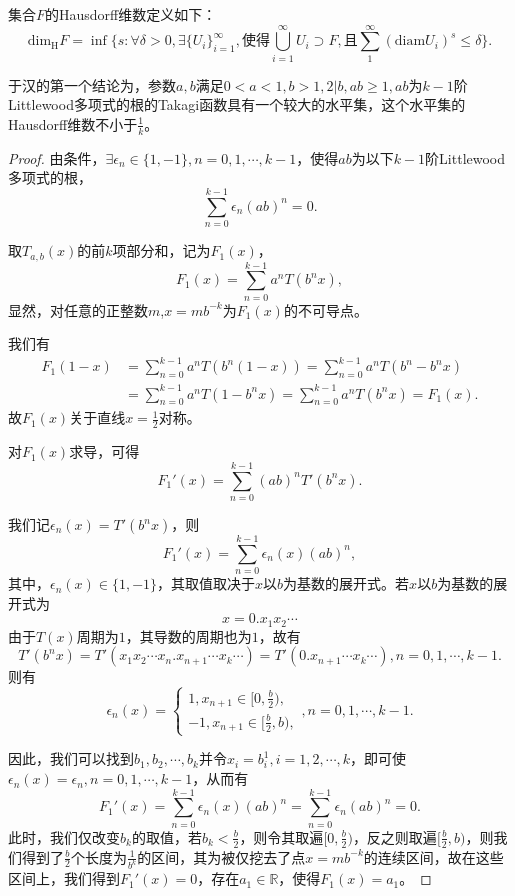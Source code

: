 \begin{definition}[Hausdorff维数]
    集合$F$的Hausdorff维数定义如下：
    $$
        \mathrm{dim_H}F=\inf\Big\{s:\forall \delta>0,\exists\{U_i\}_{i=1}^\infty,\mbox{使得}\bigcup_{i=1}^\infty U_i\supset F,\mbox{且}\sum_{1}^{\infty}(\mathrm{diam}U_i)^s\le\delta\Big\}.
    $$
\end{definition}

于汉的第一个结论为，参数$a,b$满足$0<a<1,b>1,2|b,ab\ge1,ab$为$k-1$阶Littlewood多项式的根的Takagi函数具有一个较大的水平集，这个水平集的Hausdorff维数不小于$\frac{1}{k}$。

\begin{proof}
    由条件，$\exists\epsilon_n\in\{1,-1\},n=0,1,\cdots,k-1$，使得$ab$为以下$k-1$阶Littlewood多项式的根，
    $$
        \sum_{n=0}^{k-1}\epsilon_n(ab)^n=0.
    $$

    取$T_{a,b}(x)$的前$k$项部分和，记为$F_1(x)$，
    $$
        F_1(x)=\sum_{n=0}^{k-1}a^nT(b^nx),
    $$
    显然，对任意的正整数$m$,$x=mb^{-k}$为$F_1(x)$的不可导点。

    我们有
    $$
        \begin{aligned}
            F_1(1-x) & =\sum_{n=0}^{k-1}a^nT(b^n(1-x))=\sum_{n=0}^{k-1}a^nT(b^n-b^nx) \\
                   & =\sum_{n=0}^{k-1}a^nT(1-b^nx)=\sum_{n=0}^{k-1}a^nT(b^nx)=F_1(x).
        \end{aligned}
    $$
    故$F_1(x)$关于直线$x=\frac{1}{2}$对称。

    对$F_1(x)$求导，可得
    $$
        F_1'(x)=\sum_{n=0}^{k-1}(ab)^nT'(b^nx).
    $$

    我们记$\epsilon_n(x)=T'(b^nx)$，则
    $$
        F_1'(x)=\sum_{n=0}^{k-1}\epsilon_n(x)(ab)^n,
    $$
    其中，$\epsilon_n(x)\in\{1,-1\}$，其取值取决于$x$以$b$为基数的展开式。若$x$以$b$为基数的展开式为
    $$
        x=0.x_1x_2\cdots
    $$
    由于$T(x)$周期为$1$，其导数的周期也为$1$，故有
    $$
        T'(b^nx)=T'(x_1x_2\cdots x_n.x_{n+1}\cdots x_k\cdots)=T'(0.x_{n+1}\cdots x_k\cdots),n=0,1,\cdots,k-1.
    $$
    则有
    $$
        \epsilon_n(x)=
        \begin{cases}
            1,x_{n+1}\in[0,\frac{b}{2}),\\
            -1,x_{n+1}\in[\frac{b}{2},b),
        \end{cases},n=0,1,\cdots,k-1.
    $$

    因此，我们可以找到$b_1,b_2,\cdots,b_k$并令$x_i=b^1_i,i=1,2,\cdots,k$，即可使$\epsilon_n(x)=\epsilon_n,n=0,1,\cdots,k-1$，从而有
    $$
        F_1'(x)=\sum_{n=0}^{k-1}\epsilon_n(x)(ab)^n=\sum_{n=0}^{k-1}\epsilon_n(ab)^n=0.
    $$
    此时，我们仅改变$b_k$的取值，若$b_k<\frac{b}{2}$，则令其取遍$[0,\frac{b}{2})$，反之则取遍$[\frac{b}{2},b)$，则我们得到了$\frac{b}{2}$个长度为$\frac{1}{b^k}$的区间，其为被仅挖去了点$x=mb^{-k}$的连续区间，故在这些区间上，我们得到$F_1'(x)=0$，存在$a_1\in\mathbb{R}$，使得$F_1(x)=a_1$。


\end{proof}
